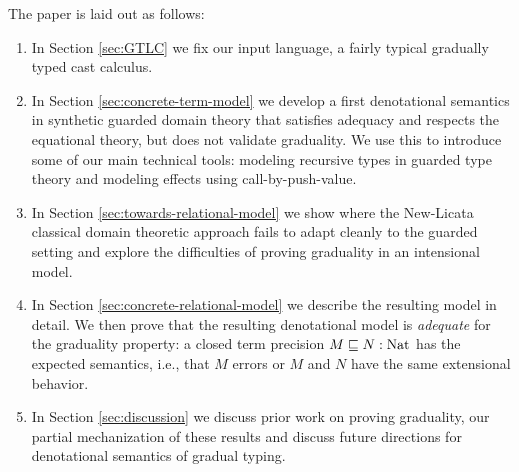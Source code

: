 The paper is laid out as follows:
\begin{enumerate}
\item In Section \ref{sec:GTLC} we fix our input language, a fairly
  typical gradually typed cast calculus.
\item In Section \ref{sec:concrete-term-model} we develop a first
  denotational semantics in synthetic guarded domain theory that
  satisfies adequacy and respects the equational theory, but does not
  validate graduality. We use this to introduce some of our main
  technical tools: modeling recursive types in guarded type theory and
  modeling effects using call-by-push-value.
\item In Section \ref{sec:towards-relational-model} we show where the
  New-Licata classical domain theoretic approach fails to adapt
  cleanly to the guarded setting and explore the difficulties of
  proving graduality in an intensional model.
\item In Section \ref{sec:concrete-relational-model} we describe the resulting
  model in detail. We then prove that the resulting denotational model is
  \emph{adequate} for the graduality property: a closed term precision $M \sqsubseteq
  N : \text{Nat}$ has the expected semantics, i.e., that $M$ errors or $M$ and $N$ have the
  same extensional behavior.
\item In Section \ref{sec:discussion} we discuss prior work on proving
  graduality, our partial mechanization of these results and discuss
  future directions for denotational semantics of gradual typing.
\end{enumerate}
